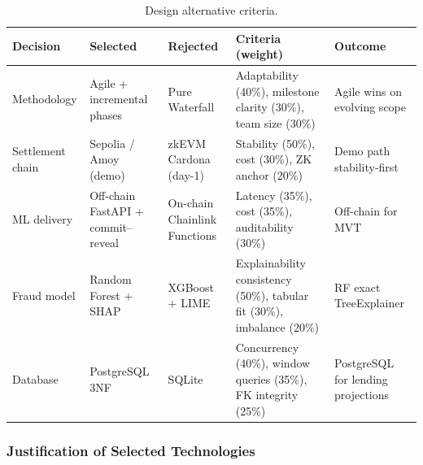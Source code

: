 \documentclass[12pt,a4paper]{report}
\newcommand{\tableheadcolor}{\rowcolor{TableHeadBg}}
\begin{document}
\begin{table}[H]
\centering
\caption[Design alternative criteria]{Design alternative criteria.}
\label{tab:design-alternatives-criteria}
\footnotesize
\begin{tabular}{@{}p{2.6cm}p{2.2cm}p{2.2cm}p{2.8cm}p{3.4cm}@{}}
\toprule
\tableheadcolor
\textbf{Decision} & \textbf{Selected} & \textbf{Rejected} & \textbf{Criteria (weight)} & \textbf{Outcome} \\
\midrule
Methodology & Agile + incremental phases & Pure Waterfall & Adaptability (40\%), milestone clarity (30\%), team size (30\%) & Agile wins on evolving scope \\
Settlement chain & Sepolia / Amoy (demo) & zkEVM Cardona (day-1) & Stability (50\%), cost (30\%), ZK anchor (20\%) & Demo path stability-first \\
ML delivery & Off-chain FastAPI + commit--reveal & On-chain Chainlink Functions & Latency (35\%), cost (35\%), auditability (30\%) & Off-chain for MVT \\
Fraud model & Random Forest + SHAP & XGBoost + LIME & Explainability consistency (50\%), tabular fit (30\%), imbalance (20\%) & RF exact TreeExplainer \\
Database & PostgreSQL 3NF & SQLite & Concurrency (40\%), window queries (35\%), FK integrity (25\%) & PostgreSQL for lending projections \\
\bottomrule
\end{tabular}
\end{table}

\subsubsection{Justification of Selected Technologies}
\end{document}
